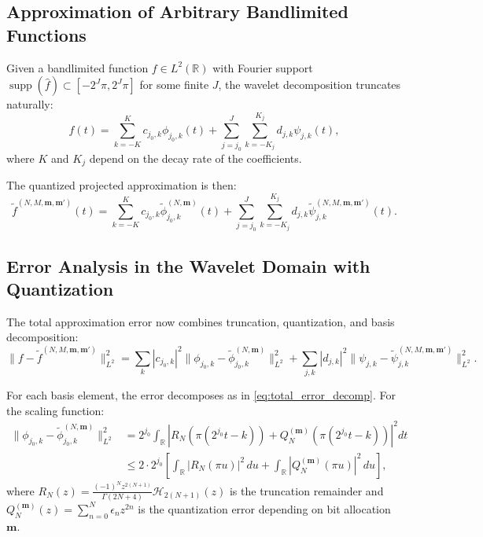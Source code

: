 \subsection{Approximation of Arbitrary Bandlimited Functions}

Given a bandlimited function $f \in L^2(\mathbb{R})$ with Fourier support $\operatorname{supp}(\widehat{f}) \subset [-2^{J}\pi, 2^{J}\pi]$ for some finite $J$, the wavelet decomposition truncates naturally:
\begin{equation}
f(t) = \sum_{k=-K}^{K} c_{j_0,k} \phi_{j_0,k}(t) + \sum_{j=j_0}^{J}\sum_{k=-K_j}^{K_j} d_{j,k} \psi_{j,k}(t),
\label{eq:finite_wavelet_decomp}
\end{equation}
where $K$ and $K_j$ depend on the decay rate of the coefficients.

The quantized projected approximation is then:
\begin{equation}
\widetilde{f}^{(N,M,\mathbf{m},\mathbf{m}')}(t) = \sum_{k=-K}^{K} c_{j_0,k} \widetilde{\phi}_{j_0,k}^{(N,\mathbf{m})}(t) + \sum_{j=j_0}^{J}\sum_{k=-K_j}^{K_j} d_{j,k} \widetilde{\psi}_{j,k}^{(N,M,\mathbf{m},\mathbf{m}')}(t).
\label{eq:proj_approx}
\end{equation}

\subsection{Error Analysis in the Wavelet Domain with Quantization}

The total approximation error now combines truncation, quantization, and basis decomposition:
\begin{equation}
\|f - \widetilde{f}^{(N,M,\mathbf{m},\mathbf{m}')}\|_{L^2}^2 = \sum_{k} |c_{j_0,k}|^2 \|\phi_{j_0,k} - \widetilde{\phi}_{j_0,k}^{(N,\mathbf{m})}\|_{L^2}^2 + \sum_{j,k} |d_{j,k}|^2 \|\psi_{j,k} - \widetilde{\psi}_{j,k}^{(N,M,\mathbf{m},\mathbf{m}')}\|_{L^2}^2.
\label{eq:wavelet_error}
\end{equation}

For each basis element, the error decomposes as in \eqref{eq:total_error_decomp}. For the scaling function:
\begin{align}
\|\phi_{j_0,k} - \widetilde{\phi}_{j_0,k}^{(N,\mathbf{m})}\|_{L^2}^2 &= 2^{j_0} \int_{\mathbb{R}} \left|R_N\left(\pi(2^{j_0}t - k)\right) + Q_N^{(\mathbf{m})}\left(\pi(2^{j_0}t - k)\right)\right|^2 dt \nonumber\\
&\leq 2 \cdot 2^{j_0} \left[\int_{\mathbb{R}} |R_N(\pi u)|^2 \, du + \int_{\mathbb{R}} |Q_N^{(\mathbf{m})}(\pi u)|^2 \, du\right],
\label{eq:scaling_error_norm}
\end{align}
where $R_N(z) = \frac{(-1)^N z^{2(N+1)}}{\Gamma(2N+4)} \mathcal{H}_{2(N+1)}(z)$ is the truncation remainder and $Q_N^{(\mathbf{m})}(z) = \sum_{n=0}^{N} \epsilon_n z^{2n}$ is the quantization error depending on bit allocation $\mathbf{m}$.

